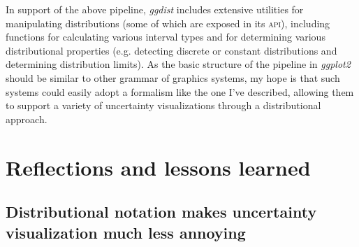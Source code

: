\documentclass[journal]{vgtc}                     %
\begin{document}
In support of the above pipeline, \textit{ggdist} includes extensive utilities for manipulating distributions (some of which are exposed in its \textsc{api}), including functions for calculating various interval types and for determining various distributional properties (e.g. detecting discrete or constant distributions and determining distribution limits). As the basic structure of the pipeline in \textit{ggplot2} should be similar to other grammar of graphics systems, my hope is that such systems could easily adopt a formalism like the one I've described, allowing them to support a variety of uncertainty visualizations through a distributional approach.









\section{Reflections and lessons learned}


\subsection{Distributional notation makes uncertainty\\visualization much less annoying}

\end{document}
